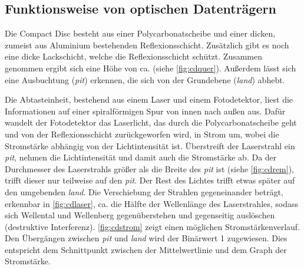 \subsection{Funktionsweise von optischen Datenträgern}
\label{subsec:cdfunktionsweise}

Die Compact Disc besteht aus einer Polycarbonatscheibe und einer
 dicken, zumeist aus Aluminium bestehenden
Reflexionsschicht. Zusätzlich gibt es noch eine  dicke
Lackschicht, welche die Reflexionsschicht schützt. Zusammen genommen ergibt sich
eine Höhe von ca.  (siehe \autoref{fig:cdquer}). Außerdem
lässt sich eine Ausbuchtung (\textit{pit}) erkennen, die sich von der Grundebene
(\textit{land}) abhebt.


Die Abtasteinheit, bestehend aus einem Laser und einem Fotodetektor, liest die
Informationen auf einer spiralförmigen Spur von innen nach außen aus. Dafür
wandelt der Fotodetektor das Laserlicht, das durch die Polycarbonatscheibe geht
und von der Reflexionsschicht zurückgeworfen wird, in Strom um, wobei die
Stromstärke abhängig von der Lichtintensität ist. Überstreift der Laserstrahl
ein \textit{pit}, nehmen die Lichtintensität und damit auch die Stromstärke ab.
Da der Durchmesser des Laserstrahls größer als die Breite des \textit{pit} ist
(siehe \autoref{fig:cdrem}), trifft dieser nur teilweise auf den \textit{pit}.
Der Rest des Lichtes trifft etwas später auf den umgebenden \textit{land}. Die
Verschiebung der Strahlen gegeneinander beträgt, erkennbar in
\autoref{fig:cdlaser}, ca. die Hälfte der Wellenlänge des Laserstrahles, sodass
sich Wellental und Wellenberg gegenüberstehen und gegenseitig auslöschen
(destruktive Interferenz). \autoref{fig:cdstrom} zeigt einen möglichen
Stromstärkenverlauf. Den Übergängen zwischen \textit{pit} und \textit{land} wird
der Binärwert 1 zugewiesen. Dies entspricht dem Schnittpunkt zwischen der
Mittelwertlinie und dem Graph der Stromstärke. \cite{cdp}

